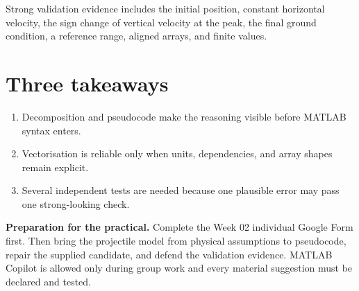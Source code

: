 \documentclass[11pt,a4paper]{article}
\begin{document}
Strong validation evidence includes the initial position, constant horizontal velocity, the sign change of vertical velocity at the peak, the final ground condition, a reference range, aligned arrays, and finite values.

\section*{Three takeaways}
\begin{enumerate}[nosep,leftmargin=6mm]
  \item Decomposition and pseudocode make the reasoning visible before MATLAB syntax enters.
  \item Vectorisation is reliable only when units, dependencies, and array shapes remain explicit.
  \item Several independent tests are needed because one plausible error may pass one strong-looking check.
\end{enumerate}

\begin{keybox}
\textbf{Preparation for the practical.} Complete the Week 02 individual Google Form first. Then bring the projectile model from physical assumptions to pseudocode, repair the supplied candidate, and defend the validation evidence. MATLAB Copilot is allowed only during group work and every material suggestion must be declared and tested.
\end{keybox}
\end{document}
